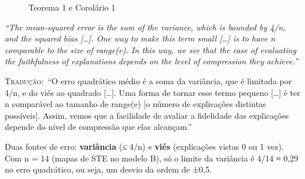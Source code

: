 \documentclass[11pt,a4paper]{article}
\newcommand{\metrictag}[2]{{\setlength{\fboxsep}{1.5pt}%
  \ifstrequal{#1}{c}{\colorbox{cC}{\textcolor{white}{\scriptsize\textbf{#2}}}}{%
  \ifstrequal{#1}{s}{\colorbox{cS}{\textcolor{white}{\scriptsize\textbf{#2}}}}{%
  \colorbox{black!60}{\textcolor{white}{\scriptsize\textbf{#2}}}}}}}
\newcommand{\pagechip}[1]{{\setlength{\fboxsep}{1.5pt}\colorbox{cAcc}{\textcolor{white}{\scriptsize\texttt{#1}}}}}
\newenvironment{origquote}{\par\itshape\small}{\par}
\newenvironment{tradquote}{\par\small\textsc{Tradução:}\ }{\par}
\newcommand{\explab}[1]{\par\smallskip{\small\color{cAcc}\textbf{\MakeUppercase{#1}}}\par}
\begin{document}
\begin{citacard}{\pagechip{p. 11} Teorema 1 e Corolário 1 \metrictag{cs}{C + S}}
\begin{origquote}“The mean-squared error is the sum of the variance, which is bounded by 4/n, and the squared bias […]. One way to make this term small […] is to have n comparable to the size of range(e). In this way, we see that the ease of evaluating the faithfulness of explanations depends on the level of compression they achieve.”\end{origquote}
\begin{tradquote}“O erro quadrático médio é a soma da variância, que é limitada por 4/n, e do viés ao quadrado […]. Uma forma de tornar esse termo pequeno […] é ter n comparável ao tamanho de range(e) [o número de explicações distintas possíveis]. Assim, vemos que a facilidade de avaliar a fidelidade das explicações depende do nível de compressão que elas alcançam.”\end{tradquote}
\explab{Explicação}
Duas fontes de erro: \textbf{variância} (≤ 4/n) e \textbf{viés} (explicações vistas 0 ou 1 vez). Com n = 14 (mapas de STE no modelo B), só o limite da variância é 4/14 ≈ 0,29 no erro quadrático, ou seja, um desvio da ordem de ±0,5.
\end{citacard}
\end{document}

